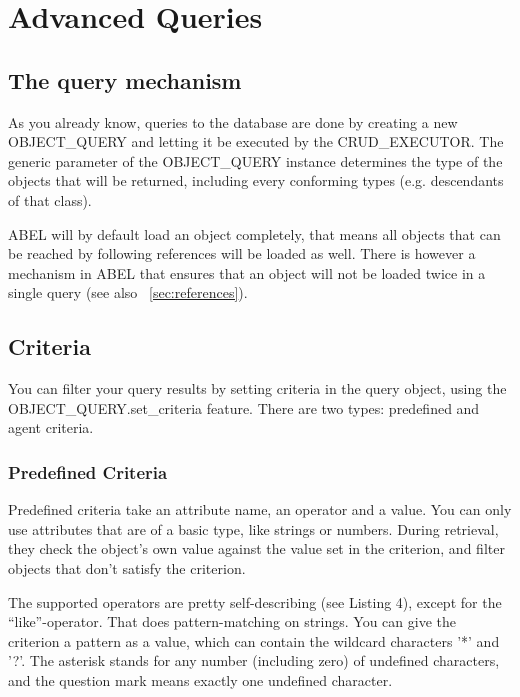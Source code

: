 \section{Advanced Queries}
\label{sec:query}

\subsection{The query mechanism}

As you already know, queries to the database are done by creating a new OBJECT\_QUERY and letting it be executed by the CRUD\_EXECUTOR.
The generic parameter of the OBJECT\_QUERY instance determines the type of the objects that will be returned, including every conforming types (e.g. descendants of that class).


ABEL will by default load an object completely, that means all objects that can be reached by following references will be loaded as well. 
There is however a mechanism in ABEL that ensures that an object will not be loaded twice in a single query (see also ~\ref{sec:references}).


\subsection{Criteria}

You can filter your query results by setting criteria in the query object, using the OBJECT\_QUERY.set\_criteria feature.
There are two types: predefined and agent criteria.

\subsubsection{Predefined Criteria}
Predefined criteria take an attribute name, an operator and a value. 
You can only use attributes that are of a basic type, like strings or numbers.
During retrieval, they check the object's own value against the value set in the criterion, and filter objects that don't satisfy the criterion.

The supported operators are pretty self-describing (see Listing 4), except for the ``like''-operator. 
That does pattern-matching on strings.
You can give the criterion a pattern as a value, which can contain the wildcard characters '*' and '?'.
The asterisk stands for any number (including zero) of undefined characters, and the question mark means exactly one undefined character.

